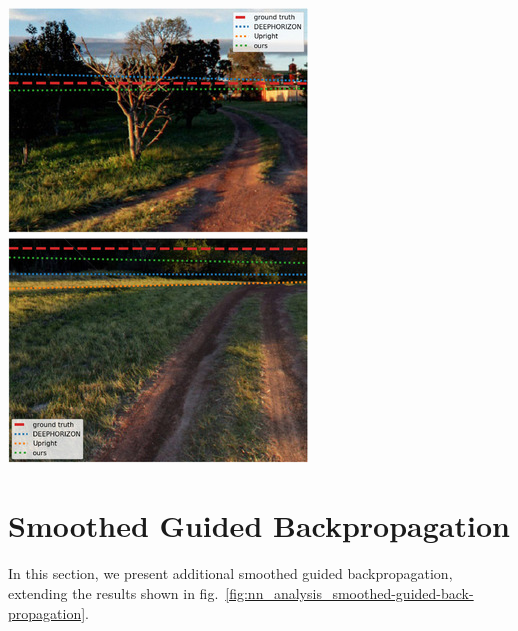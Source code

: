 \includegraphics{horizon_estimation/thumb/pano_addknxbljsbxqc-0.jpg}
\includegraphics{horizon_estimation/thumb/pano_addknxbljsbxqc-1.jpg}


\clearpage

\protect\hypertarget{sgbp}{}{}

\hypertarget{smoothed-guided-backpropagation}{%
\section{Smoothed Guided Backpropagation}\label{smoothed-guided-backpropagation}}

In this section, we present additional smoothed guided backpropagation,
extending the results shown in fig.~\ref{fig:nn_analysis_smoothed-guided-back-propagation}.

